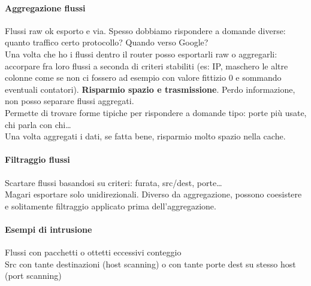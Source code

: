\documentclass[10pt]{book}
\begin{document}
\paragraph{Aggregazione flussi} Flussi raw ok esporto e via. Spesso dobbiamo rispondere a domande diverse: quanto traffico certo protocollo? Quando verso Google?\\
Una volta che ho i flussi dentro il router posso esportarli raw o aggregarli: accorpare fra loro flussi a seconda di criteri stabiliti (es: IP, maschero le altre colonne come se non ci fossero ad esempio con valore fittizio 0 e sommando eventuali contatori). \textbf{Risparmio spazio e trasmissione}. Perdo informazione, non posso separare flussi aggregati.\\
Permette di trovare forme tipiche per rispondere a domande tipo: porte più usate, chi parla con chi\ldots\\
Una volta aggregati i dati, se fatta bene, risparmio molto spazio nella cache.
\paragraph{Filtraggio flussi} Scartare flussi basandosi su criteri: furata, src/dest, porte\ldots\\
Magari esportare solo unidirezionali. Diverso da aggregazione, possono coesistere e solitamente filtraggio applicato prima dell'aggregazione.
\paragraph{Esempi di intrusione} Flussi con pacchetti o ottetti eccessivi conteggio\\Src con tante destinazioni (host scanning) o con tante porte dest su stesso host (port scanning)
\end{document}
